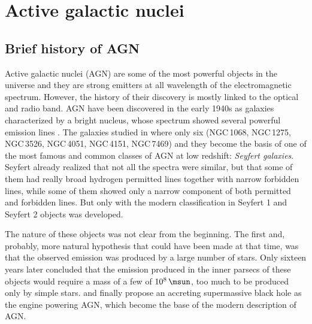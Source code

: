 \documentclass[../thesis.tex]{subfiles}
\begin{document}
\chapter{Active galactic nuclei}
\label{cap:agn}

\section{Brief history of AGN}
\label{sec:intro_history}
Active galactic nuclei (AGN) are some of the most powerful objects in the universe and they are strong emitters at all wavelength of the electromagnetic spectrum.
However, the history of their discovery is mostly linked to the optical and radio band.
AGN have been discovered in the early 1940s as galaxies characterized by a bright nucleus, whose spectrum showed several powerful emission lines \citep{Seyfert43}.
The galaxies studied in \citet{Seyfert43} where only six (NGC\,1068, NGC\,1275, NGC\,3526, NGC\,4051, NGC\,4151, NGC\,7469) and they become the basis of one of the most famous and common classes of AGN at low redshift: \emph{Seyfert galaxies}. 
Seyfert already realized that not all the spectra were similar, but that some of them had really broad hydrogen permitted lines together with narrow forbidden lines, while some of them showed only a narrow component of both permitted and forbidden lines. 
But only with \citet{Khachikian74} the modern classification in Seyfert 1 and Seyfert 2 objects was developed.

The nature of these objects was not clear from the beginning.
The first and, probably, more natural hypothesis that could have been made at that time, was that the observed emission was produced by a large number of stars.
Only sixteen years later \citet{Woltjer59} concluded that the emission produced in the inner parsecs of these objects would require a mass of a few of $10^8\,\si{\msun}$, too much to be produced only by simple stars.
\citet{Salpeter64} and \citet{Zeldovich64} finally propose an accreting supermassive black hole as the engine powering AGN, which become the base of the modern description of AGN. 
\end{document}

